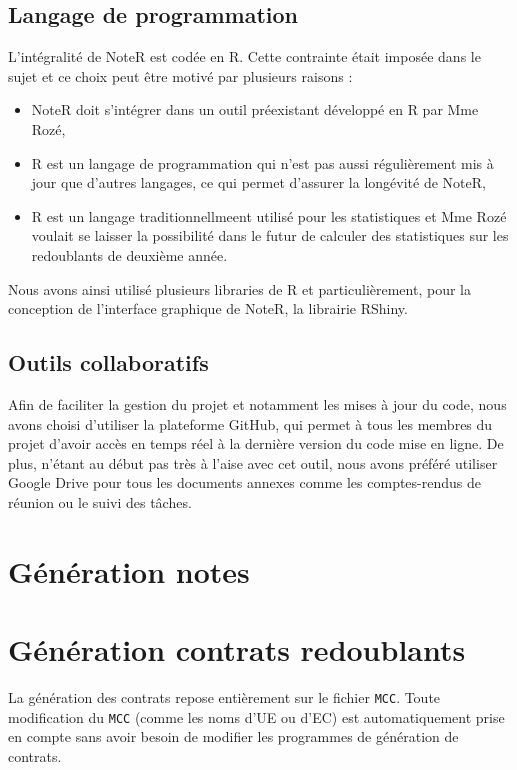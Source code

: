 \documentclass[a4paper,11pt]{article}
\begin{document}
\subsection{Langage de programmation }
    L'intégralité de NoteR est codée en R. Cette contrainte était imposée dans le sujet et ce choix peut être motivé par plusieurs raisons :
        \begin{itemize}
            \item NoteR doit s'intégrer dans un outil préexistant développé en R par Mme Rozé,
            \item R est un langage de programmation qui n'est pas aussi régulièrement mis à jour que d'autres langages, ce qui permet d'assurer la longévité de NoteR,
            \item  R est un langage traditionnellmeent utilisé pour les statistiques et Mme Rozé voulait se laisser la possibilité dans le futur de calculer des statistiques sur les redoublants de deuxième année.
        \end{itemize}
        Nous avons ainsi utilisé plusieurs libraries de R et particulièrement, pour la conception de l'interface graphique de NoteR, la librairie RShiny.
\subsection{Outils collaboratifs }
    Afin de faciliter la gestion du projet et notamment les mises à jour du code, nous avons choisi d'utiliser la plateforme GitHub, qui permet à tous les membres du projet d'avoir accès en temps réel à la dernière version du code mise en ligne. De plus, n'étant au début pas très à l'aise avec cet outil, nous avons préféré utiliser Google Drive pour tous les documents annexes comme les comptes-rendus de réunion ou le suivi des tâches.
  
\section{Génération notes }
  

\section{Génération contrats redoublants}
  La génération des contrats repose entièrement sur le fichier \texttt{MCC}. Toute modification du \texttt{MCC} (comme les noms d’UE ou d’EC) est automatiquement prise en compte sans avoir besoin de modifier les programmes de génération de contrats.
  
\end{document}
